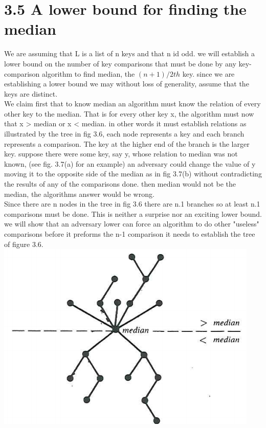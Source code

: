 \documentclass[a4paper,10pt,titlepage]{report}
\begin{document}
\section{3.5 A lower bound for finding the median}
We are assuming that L is a list of n keys and that n id odd. we will establish a lower bound on the number of key comparisons that must be done by any key-comparison algorithm to find median, the $(n+1)/2th$ key. since we are establishing a lower bound we may without loss of generality, assume that the keys are distinct.\\

We claim first that to know median an algorithm must know the relation of every other key to the median. That is for every other key x, the algorithm must now that x > median or x < median. in other words it must establish relations as illustrated by the tree in fig 3.6, each node represents a key and each branch represents a comparison. The key at the higher end of the branch is the larger key. suppose there were some key, say y, whose relation to median was not known, (see fig. 3.7(a) for an example) an adversary could change the value of y moving it to the opposite side of the median as in fig 3.7(b) without contradicting the results of any of the comparisons done. then median would not be the median, the algorithms answer would be wrong.\\
Since there are n nodes in the tree in fig 3.6 there are n.1 branches so at least n.1 comparisons must be done. This is neither a surprise nor an exciting lower bound. we will show that an adversary lower can force an algorithm to do other "useless" comparisons before it preforms the n-1 comparison it needs to establish the tree of figure 3.6.\\

\includegraphics[scale=0.4]{notes_3_6.png}
\end{document}
